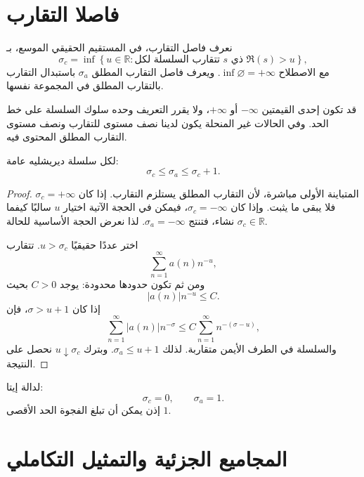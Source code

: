 \section{فاصلا التقارب}

\begin{definition}
نعرف فاصل التقارب، في المستقيم الحقيقي الموسع، بـ
\[
\sigma_c
=
\inf\left\{u\in\mathbb{R}:
\text{تتقارب السلسلة لكل }s\text{ ذي }\Re(s)>u
\right\},
\]
مع الاصطلاح \(\inf\varnothing=+\infty\). ويعرف فاصل التقارب المطلق
\(\sigma_a\) باستبدال التقارب بالتقارب المطلق في المجموعة نفسها.
\end{definition}

قد تكون إحدى القيمتين \(-\infty\) أو \(+\infty\)، ولا يقرر التعريف
وحده سلوك السلسلة على خط الحد. وفي الحالات غير المنحلة يكون لدينا نصف
مستوى للتقارب ونصف مستوى التقارب المطلق المحتوى فيه.

\begin{proposition}
\label{prop:dirichlet-series-abscissae-gap}
\provedhere
لكل سلسلة ديريشليه عامة:
\[
\sigma_c\leq\sigma_a\leq\sigma_c+1.
\]
\end{proposition}

\begin{proof}
المتباينة الأولى مباشرة، لأن التقارب المطلق يستلزم التقارب. إذا كان
\(\sigma_c=+\infty\) فلا يبقى ما يثبت. وإذا كان \(\sigma_c=-\infty\)،
فيمكن في الحجة الآتية اختيار \(u\) سالبًا كيفما نشاء، فتنتج
\(\sigma_a=-\infty\). لذا نعرض الحجة الأساسية للحالة
\(\sigma_c\in\mathbb{R}\).

اختر عددًا حقيقيًا \(u>\sigma_c\). تتقارب
\[
\sum_{n=1}^{\infty}a(n)n^{-u},
\]
ومن ثم تكون حدودها محدودة: يوجد \(C>0\) بحيث
\[
|a(n)|n^{-u}\leq C.
\]
إذا كان \(\sigma>u+1\)، فإن
\[
\sum_{n=1}^{\infty}|a(n)|n^{-\sigma}
\leq
C\sum_{n=1}^{\infty}n^{-(\sigma-u)},
\]
والسلسلة في الطرف الأيمن متقاربة. لذلك \(\sigma_a\leq u+1\). وبترك
\(u\downarrow\sigma_c\) نحصل على النتيجة.
\end{proof}

\begin{example}
لدالة إيتا:
\[
\sigma_c=0,
\qquad
\sigma_a=1.
\]
إذن يمكن أن تبلغ الفجوة الحد الأقصى \(1\).
\end{example}

\section{المجاميع الجزئية والتمثيل التكاملي}

